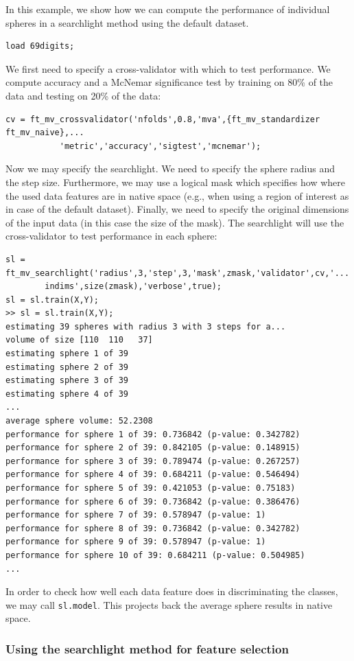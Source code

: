 \documentclass{article}
\renewcommand{\t}[1]{{\tt #1}}
\begin{document}
In this example, we show how we can compute the performance of individual spheres in a searchlight method using the default dataset. 
\begin{verbatim}
load 69digits;
\end{verbatim}
We first need to specify a cross-validator with which to test performance. We compute accuracy and a McNemar significance test by training on 80\% of the data and testing on 20\% of the data:
\begin{verbatim}
cv = ft_mv_crossvalidator('nfolds',0.8,'mva',{ft_mv_standardizer ft_mv_naive},...
           'metric','accuracy','sigtest','mcnemar');
\end{verbatim}
Now we may specify the searchlight. We need to specify the sphere radius and the step size. Furthermore, we may use a logical mask which specifies how where the used data features are in native space (e.g., when using a region of interest as in case of the default dataset). Finally, we need to specify the original dimensions of the input data (in this case the size of the mask). The searchlight will use the cross-validator to test performance in each sphere:
\begin{verbatim}
sl = ft_mv_searchlight('radius',3,'step',3,'mask',zmask,'validator',cv,'...
        indims',size(zmask),'verbose',true);
sl = sl.train(X,Y);
>> sl = sl.train(X,Y);
estimating 39 spheres with radius 3 with 3 steps for a...
volume of size [110  110   37]
estimating sphere 1 of 39
estimating sphere 2 of 39
estimating sphere 3 of 39
estimating sphere 4 of 39
...
average sphere volume: 52.2308
performance for sphere 1 of 39: 0.736842 (p-value: 0.342782)
performance for sphere 2 of 39: 0.842105 (p-value: 0.148915)
performance for sphere 3 of 39: 0.789474 (p-value: 0.267257)
performance for sphere 4 of 39: 0.684211 (p-value: 0.546494)
performance for sphere 5 of 39: 0.421053 (p-value: 0.75183)
performance for sphere 6 of 39: 0.736842 (p-value: 0.386476)
performance for sphere 7 of 39: 0.578947 (p-value: 1)
performance for sphere 8 of 39: 0.736842 (p-value: 0.342782)
performance for sphere 9 of 39: 0.578947 (p-value: 1)
performance for sphere 10 of 39: 0.684211 (p-value: 0.504985)
...
\end{verbatim}
In order to check how well each data feature  does in discriminating the classes, we may call \t{sl.model}. This projects back the average sphere results in native space.

\subsubsection*{Using the searchlight method for feature selection}
\end{document}
